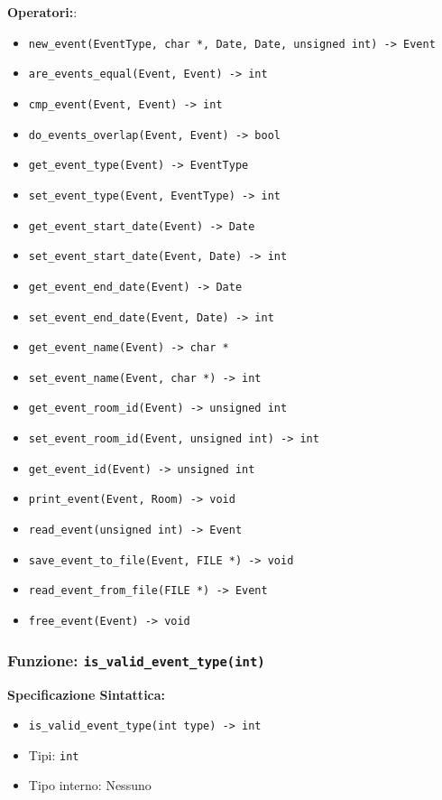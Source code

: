 \documentclass[11pt]{scrartcl} %
\begin{document}
\textbf{Operatori:}:
\begin{itemize}
\item \texttt{new\_event(EventType,  char *, Date, Date, unsigned int) -> Event}
\item \texttt{are\_events\_equal(Event, Event) -> int}
\item \texttt{cmp\_event(Event, Event) -> int}
\item \texttt{do\_events\_overlap(Event, Event) -> bool}
\item \texttt{get\_event\_type(Event) -> EventType}
\item \texttt{set\_event\_type(Event, EventType) -> int}
\item \texttt{get\_event\_start\_date(Event) -> Date}
\item \texttt{set\_event\_start\_date(Event, Date) -> int}
\item \texttt{get\_event\_end\_date(Event) -> Date}
\item \texttt{set\_event\_end\_date(Event, Date) -> int}
\item \texttt{get\_event\_name(Event) ->  char *}
\item \texttt{set\_event\_name(Event,  char *) -> int}
\item \texttt{get\_event\_room\_id(Event) -> unsigned int}
\item \texttt{set\_event\_room\_id(Event, unsigned int) -> int}
\item \texttt{get\_event\_id(Event) -> unsigned int}
\item \texttt{print\_event(Event, Room) -> void}
\item \texttt{read\_event(unsigned int) -> Event}
\item \texttt{save\_event\_to\_file(Event, FILE *) -> void}
\item \texttt{read\_event\_from\_file(FILE *) -> Event}
\item \texttt{free\_event(Event) -> void}
\end{itemize}



\subsubsection{Funzione: \texttt{is\_valid\_event\_type(int)}}

\textbf{Specificazione Sintattica:}
\begin{itemize}
\item \texttt{is\_valid\_event\_type(int type) -> int}
\item Tipi: \texttt{int}
\item Tipo interno: Nessuno
\end{itemize}
\end{document}
